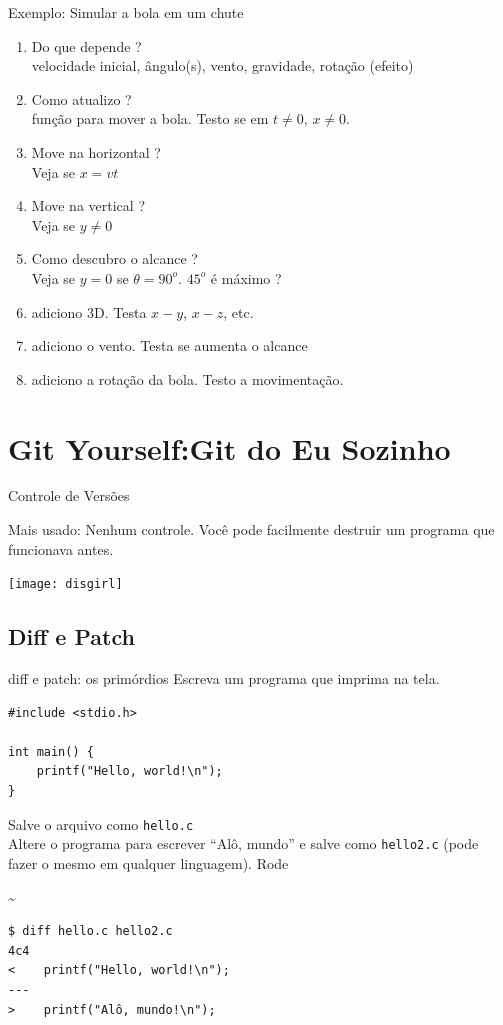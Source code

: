 \begin{frame}{Exemplo: Simular a bola em um chute}
	
\begin{enumerate}
	\item Do que depende ?\\
	velocidade inicial, ângulo(s), vento, gravidade, rotação (efeito)
	\item Como atualizo ? \\
	função para mover a bola. Testo se em $t\neq 0$, $x\neq 0$.
	\item Move na horizontal ? \\
	Veja se $x=vt$
	\item Move na vertical ? \\
	Veja se $y\neq 0$
	\item Como descubro o alcance ? \\
	Veja se $y=0$ se $\theta=90^o$. $45^o$ é máximo ?
	\item adiciono 3D. Testa $x-y$, $x-z$, etc.
	\item adiciono o vento. Testa se aumenta o alcance
	\item adiciono a rotação da bola. Testo a movimentação. 
\end{enumerate} 	
\end{frame}

\section{Git Yourself:\break Git do Eu Sozinho}
\begin{frame}{Controle de Versões}
	
Mais usado: Nenhum controle. Você pode facilmente destruir um programa que funcionava antes.	

\begin{center}
	\texttt{[image: disgirl]}
\end{center}
\end{frame}

\subsection{Diff e Patch}
\begin{frame}[fragile]{diff e patch: os primórdios}
Escreva um programa que imprima  na tela.

\begin{lstlisting}[style=cstyle]
#include <stdio.h>

int main() {
	printf("Hello, world!\n");	
}
\end{lstlisting}
Salve o arquivo como \texttt{hello.c}\\
Altere o programa para escrever ``Alô, mundo'' e salve como \texttt{hello2.c}  (pode fazer o mesmo em qualquer linguagem). Rode
\begin{terminal}{\~}
\begin{Verbatim}
$ diff hello.c hello2.c
4c4
<    printf("Hello, world!\n");	
---
>    printf("Alô, mundo!\n");	
\end{Verbatim}
\end{terminal} 
\end{frame}


